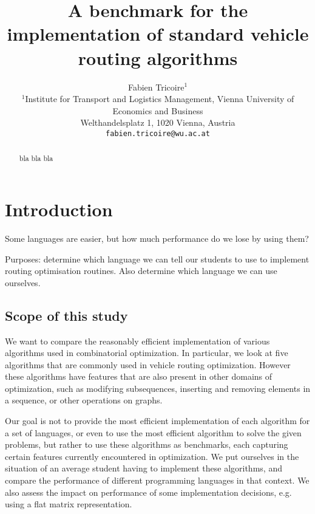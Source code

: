 \documentclass[11pt,a4paper,notitlepage]{article}
\begin{document}
\title{A benchmark for the implementation of standard vehicle routing
  algorithms}
\author{
Fabien Tricoire$^{1}$ \\[1ex]
 \small $^1$Institute for Transport and Logistics Management,
 Vienna University of Economics and Business\\
 \small Welthandelsplatz 1, 1020 Vienna, Austria\\
  \small \texttt{fabien.tricoire@wu.ac.at}\\[2ex]
}
\date{}
\maketitle

\begin{abstract}
  bla bla bla
\end{abstract}

\section{Introduction}
\label{sec:intro}

Some languages are easier, but how much performance do we lose by
using them?

Purposes: determine which language we can tell our students to
use to implement routing optimisation routines. Also determine which
language we can use ourselves.

\subsection{Scope of this study}
We want to compare the reasonably efficient implementation of various
algorithms used in combinatorial optimization. In particular, we look
at five algorithms that are commonly used in vehicle routing
optimization. However these algorithms have features that are also
present in other domains of optimization, such as modifying
subsequences, inserting and removing elements in a sequence, or other
operations on graphs.

Our goal is not to provide the most efficient implementation of each
algorithm for a set of languages, or even to use the most efficient
algorithm to solve the given problems, but rather to use these
algorithms as benchmarks, each capturing certain features currently
encountered in optimization. We put ourselves in the situation of an
average student having to implement these algorithms, and compare the
performance of different programming languages in that context. We
also assess the impact on performance of some implementation
decisions, e.g. using a flat matrix representation.
\end{document}

